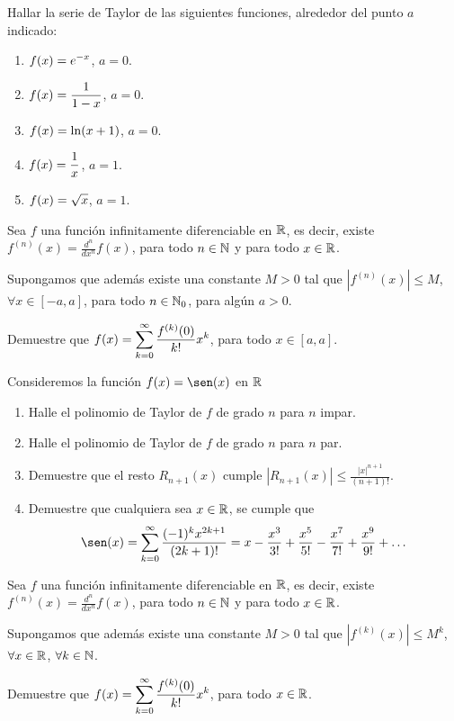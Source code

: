 \item Hallar la serie de Taylor de las siguientes funciones, alrededor del punto $a$ indicado:
\begin{multicols}{2}
  \begin{enumerate}
    \item $\displaystyle f(x) = e^{-x}$, $a = 0$.
    \item $\displaystyle f(x) = \frac1{1-x}$, $a = 0$.
    \item $\displaystyle f(x) = \ln (x+1)$, $a = 0$.
    \item $\displaystyle f(x) = \frac1x$, $a = 1$.
    \item $\displaystyle f(x) = \sqrt{x}$, $a = 1$.
  \end{enumerate}
  
\end{multicols}

\item Sea $f$ una función infinitamente diferenciable en $\mathbb{R}$, es decir, existe $f^{(n)}(x) = \frac{d^n}{dx^n}f(x)$, para todo $n\in 
\mathbb{N}$ y para todo $x\in \mathbb{R}$. 

Supongamos que además existe una constante $M>0$ tal que $|f^{(n)}(x)| \le M$, $\forall x\in [-a,a]$, para todo $n\in\mathbb{N}_0$, para algún $a>0$.

Demuestre que 
$\displaystyle f(x) = \sum_{k=0}^\infty \frac{f^{(k)}(0)}{k!}x^k$, para todo $x\in [a,a]$.

\item Consideremos la función $f(x)=\sen(x)$ en $\mathbb{R}$

\begin{enumerate}
\item Halle el polinomio de Taylor de $f$ de grado $n$ para $n$ impar.

\item Halle el polinomio de Taylor de $f$ de grado $n$ para $n$ par.

\item Demuestre que el resto $R_{n+1}(x)$ cumple $|R_{n+1}(x)| \le \frac{|x|^{n+1}}{(n+1)!}$.

\item  Demuestre que cualquiera sea $x \in \mathbb{R}$, se cumple que
\[ 
\sen(x) = \sum_{k=0}^\infty \frac{(-1)^k x^{2k+1} }{(2k+1)!}  
= x - \frac{x^3}{3!} + \frac{x^5}{5!} - \frac{x^7}{7!} + \frac{x^9}{9!} + \dots
\]
\end{enumerate}

\item Sea $f$ una función infinitamente diferenciable en $\mathbb{R}$, es decir, existe $f^{(n)}(x) = \frac{d^n}{dx^n}f(x)$, para todo $n\in 
\mathbb{N}$ y para todo $x\in \mathbb{R}$. 

Supongamos que además existe una constante $M>0$ tal que $|f^{(k)}(x)| \le M^k$, $\forall x\in \mathbb{R}$, $\forall k \in \mathbb{N}$.

Demuestre que 
$\displaystyle f(x) = \sum_{k=0}^\infty \frac{f^{(k)}(0)}{k!}x^k$, para todo $x\in \mathbb{R}$.